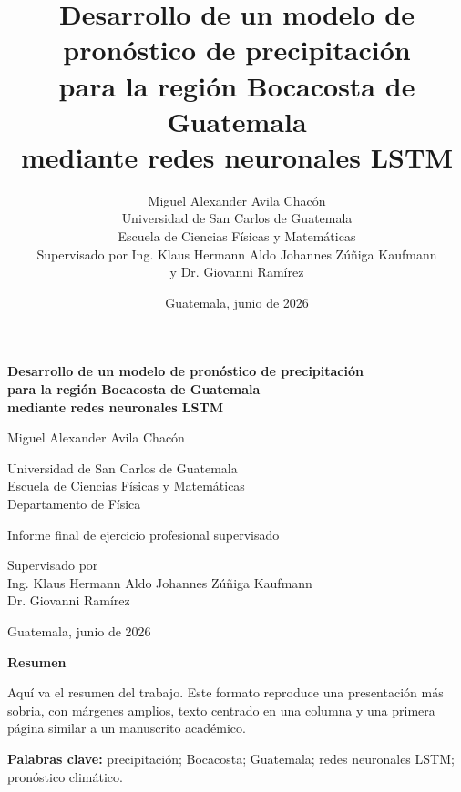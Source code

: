 \documentclass[11pt,letterpaper,oneside]{report}
\title{
  \LARGE\bfseries
  Desarrollo de un modelo de pronóstico de precipitación\\
  para la región Bocacosta de Guatemala\\
  mediante redes neuronales LSTM
}
\author{
  Miguel Alexander Avila Chacón\\[0.4em]
  \small Universidad de San Carlos de Guatemala\\
  \small Escuela de Ciencias Físicas y Matemáticas\\[0.4em]
  \small Supervisado por Ing. Klaus Hermann Aldo Johannes Zúñiga Kaufmann\\
  \small y Dr. Giovanni Ramírez
}
\date{\small Guatemala, junio de 2026}
\begin{document}
\begin{titlepage}
\thispagestyle{empty}

\vspace*{1.5cm}

\begin{center}

{\LARGE\bfseries
Desarrollo de un modelo de pronóstico de precipitación\\
para la región Bocacosta de Guatemala\\
mediante redes neuronales LSTM
\par}

\vspace{1.5cm}

{\large Miguel Alexander Avila Chacón\par}

\vspace{0.5cm}

{\small
Universidad de San Carlos de Guatemala\\
Escuela de Ciencias Físicas y Matemáticas\\
Departamento de Física
\par}

\vspace{0.5cm}

{\small
Informe final de ejercicio profesional supervisado
\par}

\vspace{0.5cm}

{\small
Supervisado por\\
Ing. Klaus Hermann Aldo Johannes Zúñiga Kaufmann\\
Dr. Giovanni Ramírez
\par}

\vspace{1.5cm}

{\small Guatemala, junio de 2026\par}

\end{center}

\vfill

\newpage

\begin{center}
\begin{minipage}{0.82\textwidth}
\begin{center}
\textbf{Resumen}
\end{center}

Aquí va el resumen del trabajo. Este formato reproduce una presentación más sobria,
con márgenes amplios, texto centrado en una columna y una primera página similar
a un manuscrito académico.

\vspace{1em}

\noindent\textbf{Palabras clave:} precipitación; Bocacosta; Guatemala; redes neuronales LSTM; pronóstico climático.
\end{minipage}
\end{center}

\end{titlepage}
\end{document}
